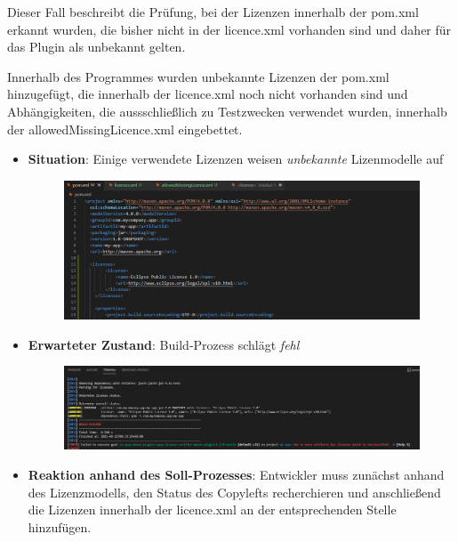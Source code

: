 Dieser Fall beschreibt die Prüfung, bei der Lizenzen innerhalb der pom.xml erkannt wurden, die bisher nicht in der licence.xml vorhanden sind und daher für das Plugin als unbekannt gelten. 

Innerhalb des Programmes wurden unbekannte Lizenzen der pom.xml hinzugefügt, die innerhalb der licence.xml noch nicht vorhanden sind und Abhängigkeiten, die aussschließlich zu Testzwecken verwendet wurden, innerhalb der allowedMissingLicence.xml eingebettet. 

\begin{itemize}
    \item \textbf{Situation}: Einige verwendete Lizenzen weisen \textit{unbekannte} Lizenmodelle auf
    
    \begin{figure}[h]
        \centering
        \includegraphics[scale=0.5]{Bilder/Fall3Situation.png}
    \end{figure}

    \item \textbf{Erwarteter Zustand}: Build-Prozess schlägt \textit{fehl} 
    
    \begin{figure}[h]
        \centering
        \includegraphics[scale=0.4]{Bilder/Fall3Zustand.png}
    \end{figure}

    \item \textbf{Reaktion anhand des Soll-Prozesses}: Entwickler muss zunächst anhand des Lizenzmodells, den Status des Copylefts recherchieren und anschließend die Lizenzen innerhalb der licence.xml an der entsprechenden Stelle hinzufügen. 
\end{itemize}

